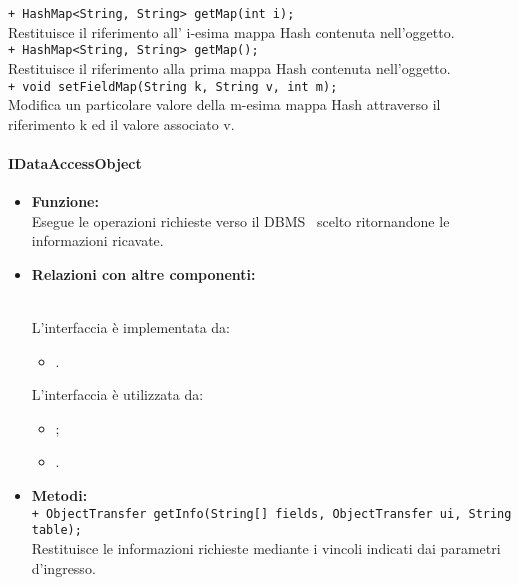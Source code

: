 {\begin{sloppypar}
{{{{\begin{itemize}
{				\texttt{+ HashMap<String, String> getMap(int i);} \\
				Restituisce il riferimento all' i-esima mappa Hash contenuta nell'oggetto.\\
	
				\texttt{+ HashMap<String, String> getMap();} \\
				Restituisce il riferimento alla prima mappa Hash contenuta nell'oggetto.\\
				
				\texttt{+ void setFieldMap(String k, String v, int m);} \\
				Modifica un particolare valore della m-esima mappa Hash attraverso il riferimento k ed il valore associato v.\\
				}
			\end{itemize}
			}%
			
			
			\paragraph{IDataAccessObject}\label{par:IDataAccessObject}{
			\begin{itemize}

				\item[] \textbf{Funzione:}{\\
				Esegue le operazioni richieste verso il DBMS\g~ scelto ritornandone le informazioni ricavate.\\
				}
			
				\item[] \textbf{Relazioni con altre componenti:}{\\
				L’interfaccia è implementata da:
				\begin{itemize}
				 	\item[]	.
				\end{itemize} 		
				L’interfaccia è utilizzata da:
				\begin{itemize}
					\item[]	;
					\item[]	.\\
				\end{itemize}
				}
			
				\item[] \textbf{Metodi:}{ \\
				\texttt{+ ObjectTransfer getInfo(String[] fields, ObjectTransfer ui, String table);}\\
				Restituisce le informazioni richieste mediante i vincoli indicati dai parametri d'ingresso.\\
				
}
\end{itemize}}}}}
\end{sloppypar}}
